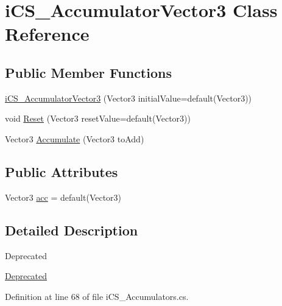 \hypertarget{classi_c_s___accumulator_vector3}{\section{i\+C\+S\+\_\+\+Accumulator\+Vector3 Class Reference}
\label{classi_c_s___accumulator_vector3}
}
\subsection*{Public Member Functions}
\begin{DoxyCompactItemize}
\item 
\hyperlink{classi_c_s___accumulator_vector3_ab953f1d630502811ad432146e1e03f43}{i\+C\+S\+\_\+\+Accumulator\+Vector3} (Vector3 initial\+Value=default(Vector3))
\item 
void \hyperlink{classi_c_s___accumulator_vector3_a3344256bbd31a418b49b3a32588cf60c}{Reset} (Vector3 reset\+Value=default(Vector3))
\item 
Vector3 \hyperlink{classi_c_s___accumulator_vector3_a41d0c92da04f747d9de53fea755b7786}{Accumulate} (Vector3 to\+Add)
\end{DoxyCompactItemize}
\subsection*{Public Attributes}
\begin{DoxyCompactItemize}
\item 
Vector3 \hyperlink{classi_c_s___accumulator_vector3_a583bb8a0464ce5e15a37437c45c4d475}{acc} = default(Vector3)
\end{DoxyCompactItemize}


\subsection{Detailed Description}
\begin{DoxyRefDesc}{Deprecated}
\item[\hyperlink{deprecated__deprecated000004}{Deprecated}]\end{DoxyRefDesc}


Definition at line 68 of file i\+C\+S\+\_\+\+Accumulators.\+cs.



